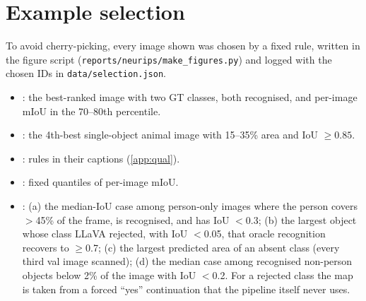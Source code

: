 \documentclass{article}
\newcommand{\miou}{mIoU}
\begin{document}
\section{Example selection}
\label{app:selection}
To avoid cherry-picking, every image shown was chosen by a fixed rule, written in the figure script
(\texttt{reports/neurips/make\_figures.py}) and logged with the chosen IDs in
\texttt{data/selection.json}.
\begin{itemize}[leftmargin=1.2em]
  \item {}: the best-ranked image with two GT classes, both recognised, and per-image
        \miou{} in the 70--80th percentile.
  \item {}: the 4th-best single-object animal image with 15--35\% area and IoU
        $\geq0.85$.
  \item {}: rules in their captions (\cref{app:qual}).
  \item {}: fixed quantiles of per-image \miou{}.
  \item {}: (a) the median-IoU case among person-only images where the person covers
        $>$45\% of the frame, is recognised, and has IoU $<$0.3; (b) the largest object whose class
        LLaVA rejected, with IoU $<$0.05, that oracle recognition recovers to $\geq$0.7; (c) the
        largest predicted area of an absent class (every third val image scanned); (d) the median case
        among recognised non-person objects below 2\% of the image with IoU $<$0.2. For a rejected
        class the map is taken from a forced ``yes'' continuation that the pipeline itself never uses.
\end{itemize}
\end{document}
